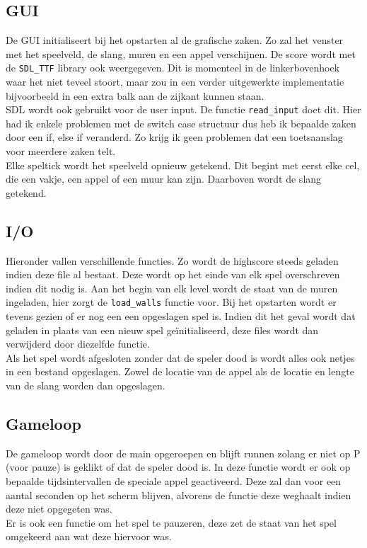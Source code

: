 \documentclass[11pt, oneside]{article}   	%
\begin{document}
	\subsection{GUI}
	De GUI initialiseert bij het opstarten al de grafische zaken. Zo zal het venster met het speelveld, de slang, muren en een appel verschijnen. De score wordt met de \texttt{SDL\_TTF} library ook weergegeven. Dit is momenteel in de linkerbovenhoek waar het niet teveel stoort, maar zou in een verder uitgewerkte implementatie bijvoorbeeld in een extra balk aan de zijkant kunnen staan. \\
	SDL wordt ook gebruikt voor de user input. De functie \texttt{read\_input} doet dit. Hier had ik enkele problemen met de switch case structuur dus heb ik bepaalde zaken door een if, else if veranderd. Zo krijg ik geen problemen dat een toetsaanslag voor meerdere zaken telt.  \\
	Elke speltick wordt het speelveld opnieuw getekend. Dit begint met eerst elke cel, die een vakje, een appel of een muur kan zijn. Daarboven wordt de slang getekend. \\
	\subsection{I/O}
	Hieronder vallen verschillende functies. Zo wordt de highscore steeds geladen indien deze file al bestaat. Deze wordt op het einde van elk spel overschreven indien dit nodig is. 
	Aan het begin van elk level wordt de staat van de muren ingeladen, hier zorgt de \texttt{load\_walls} functie voor. Bij het opstarten wordt er tevens gezien of er nog een een opgeslagen spel is. Indien dit het geval wordt dat geladen in plaats van een nieuw spel ge\"{i}nitialiseerd, deze files wordt dan verwijderd door diezelfde functie. \\
	Als het spel wordt afgesloten zonder dat de speler dood is wordt alles ook netjes in een bestand opgeslagen. Zowel de locatie van de appel als de locatie en lengte van de slang worden dan opgeslagen. 
	\subsection{Gameloop}
	De gameloop wordt door de main opgeroepen en blijft runnen zolang er niet op P (voor pauze) is geklikt of dat de speler dood is. In deze functie wordt er ook op bepaalde tijdsintervallen de speciale appel geactiveerd. Deze zal dan voor een aantal seconden op het scherm blijven, alvorens de functie deze weghaalt indien deze niet opgegeten was.\\
	Er is ook een functie om het spel te pauzeren, deze zet de staat van het spel omgekeerd aan wat deze hiervoor was. 
\end{document}
